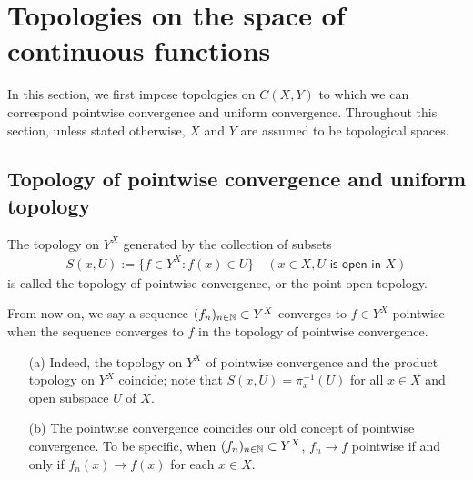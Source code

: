 \section{Topologies on the space of continuous functions}

In this section, we first impose topologies on $C(X, Y)$ to which we can correspond pointwise convergence and uniform convergence.
Throughout this section, unless stated otherwise, $X$ and $Y$ are assumed to be topological spaces.

\subsection{Topology of pointwise convergence and uniform topology}

\begin{defi}
    The topology on $Y^X$ generated by the collection of subsets
    \begin{align*}
        S(x, U):=\{f\in Y^X: f(x)\in U\}\quad(x\in X, U\textsf{ is open in }X)
    \end{align*}
    is called the topology of pointwise convergence, or the point-open topology.
\end{defi}
From now on, we say a sequence $(f_n)_{n\in{\mathbb{N}}}\subset Y^X$ converges to $f\in Y^X$ pointwise when the sequence converges to $f$ in the topology of pointwise convergence.
\begin{rmk}
    \begin{enumerate}
        \item[(a)]
        {
            Indeed, the topology on $Y^X$ of pointwise convergence and the product topology on $Y^X$ coincide; note that $S(x, U)=\pi_x^{-1}(U)$ for all $x\in X$ and open subspace $U$ of $X$.
        }
        \item[(b)]
        {
            The pointwise convergence coincides our old concept of pointwise convergence.
            To be specific, when $(f_n)_{n\in{\mathbb{N}}}\subset Y^X$, $f_n\rightarrow f$ pointwise if and only if $f_n(x)\rightarrow f(x)$ for each $x\in X$.
        }
    \end{enumerate}
\end{rmk}

